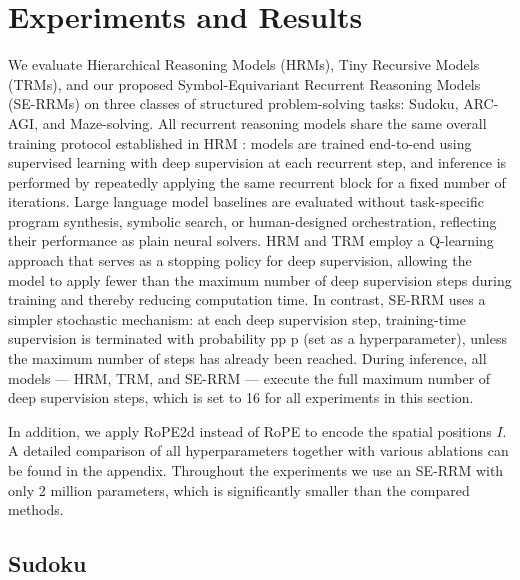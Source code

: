 \documentclass{article}
\theoremstyle{plain}
\theoremstyle{definition}
\theoremstyle{remark}
\begin{document}
\fi



\section{Experiments and Results}
We evaluate Hierarchical Reasoning Models (HRMs), Tiny Recursive Models (TRMs), 
and our proposed Symbol-Equivariant Recurrent Reasoning Models (SE-RRMs) 
on three classes of structured problem-solving tasks: Sudoku, ARC-AGI, and Maze-solving. 
All recurrent reasoning models share the same overall training protocol established in HRM \citep{wang2025hierarchical}: 
models are trained end-to-end using supervised learning with deep supervision 
at each recurrent step, and inference is performed by repeatedly 
applying the same recurrent block for a fixed number of iterations. 
Large language model baselines are evaluated without 
task-specific program synthesis, symbolic search, or 
human-designed orchestration, reflecting their performance as plain neural solvers.
%
HRM and TRM employ a Q-learning approach that serves as a stopping policy for deep supervision, allowing the model to apply fewer than the maximum number of deep supervision steps during training and thereby reducing computation time. In contrast, SE-RRM uses a simpler stochastic mechanism: at each deep supervision step, training-time supervision is terminated with probability pp
p (set as a hyperparameter), unless the maximum number of steps has already been reached. During inference, all models — HRM, TRM, and SE-RRM — execute the full maximum number of deep supervision steps, which is set to 16 for all experiments in this section.

In addition, we apply RoPE2d \citep{heo2024rotary} instead of RoPE to encode the spatial positions $I$.
A detailed comparison of all hyperparameters together with various ablations can be found in the appendix. Throughout the experiments we use an SE-RRM with only 2 million parameters, which is significantly smaller than the compared methods.

\subsection{Sudoku}
\end{document}
